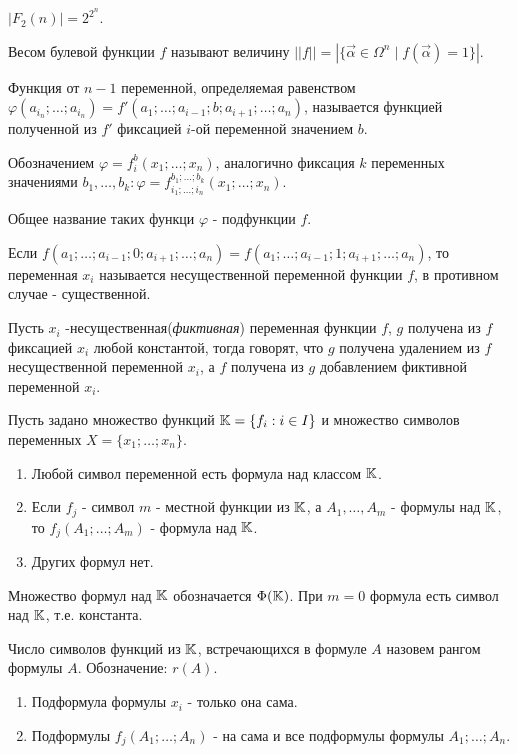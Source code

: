 \utv $|F_2(n)|= 2^{2^n}$.

\opr Весом булевой функции $f$ называют величину $||f|| = |\{\vec{\alpha} \in \Omega^n \mid f(\vec{\alpha}) = 1\}|$.

\opr Функция от $n-1$ переменной, определяемая равенством $\varphi(a_{i_n}; \dots; a_{i_n}) = f'(a_1; \dots; a_{i-1}; b; a_{i+1}; \dots; a_n)$, называется
функцией полученной из $f'$ фиксацией $i$-ой переменной значением $b$.

Обозначением $\varphi = f_i^b(x_1; \dots; x_n)$, аналогично фиксация $k$ переменных значениями $b_1,\dots, b_k : \varphi = f_{i_1; \dots; i_n}^{b_1; \dots; b_k}(x_1; \dots; x_n)$.

Общее название таких функци $\varphi$ - подфункции $f$. 

Если $f(a_1; \dots; a_{i-1};0;a_{i+1}; \dots; a_n) = f(a_1; \dots; a_{i-1};1;a_{i+1}; \dots; a_n)$, то
переменная $x_i$ называется несущественной переменной функции $f$, в противном случае - существенной.

\opr Пусть $x_i$ -несущественная(\emph{фиктивная}) переменная функции $f$, $g$ получена из $f$ фиксацией $x_i$ любой константой, тогда говорят, что $g$
получена удалением из $f$ несущественной переменной $x_i$, а $f$ получена из $g$ добавлением фиктивной переменной $x_i$.

Пусть задано множество функций $\mathbb{K} = \{f_i : i \in I\}$ и множество символов переменных $X = \{x_1; \dots; x_n\}$.

\opr \begin{enumerate}
    \item Любой символ переменной есть формула над классом $\mathbb{K}$.
    \item Если $f_j$ - символ $m$ - местной функции из $\mathbb{K}$, а $A_1, \dots, A_m$ - формулы над $\mathbb{K}$, то $f_j(A_1; \dots; A_m)$ - формула над $\mathbb{K}$.
    \item Других формул нет.
\end{enumerate}

Множество формул над $\mathbb{K}$ обозначается $\Phi(\mathbb{K})$. При $m=0$ формула есть символ над $\mathbb{K}$, т.е. константа.

\opr Число символов функций из $\mathbb{K}$, встречающихся в формуле $A$ назовем рангом формулы $A$. Обозначение: $r(A)$.

\opr \begin{enumerate}
    \item Подформула формулы $x_i$ - только она сама.
    \item Подформулы $f_j(A_1; \dots; A_n)$ - на сама и все подформулы формулы $A_1; \dots; A_n$.
\end{enumerate}


